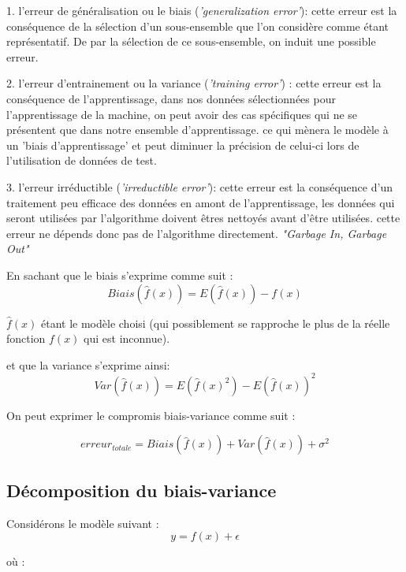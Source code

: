 \documentclass[a4paper]{article}
\begin{document}
1. l'erreur de généralisation ou le biais (\textit{'generalization error'}): cette erreur est la conséquence de la sélection d'un sous-ensemble que l'on considère comme étant représentatif. De par la sélection de ce sous-ensemble, on induit une possible erreur.\newline

2. l'erreur d'entrainement ou la variance (\textit{'training error'}) : cette erreur est la conséquence de l'apprentissage, dans nos données sélectionnées pour l'apprentissage de la machine, on peut avoir des cas spécifiques qui ne se présentent que dans notre ensemble d'apprentissage. ce qui mènera le modèle à un 'biais d'apprentissage' et peut diminuer la précision de celui-ci lors de l'utilisation de données de test.\newline

3. l'erreur irréductible (\textit{'irreductible error'}): cette erreur est la conséquence d'un traitement peu efficace des données en amont de l'apprentissage, les données qui seront utilisées par l'algorithme doivent êtres nettoyés avant d'être utilisées. cette erreur ne dépends donc pas de l'algorithme directement. \textit{"Garbage In, Garbage Out"}\newline


En sachant que le biais s'exprime comme suit : 
\[ Biais(\hat{f}(x)) = E(\hat{f}(x)) - f(x)\]

 $\hat{f}(x)$ étant le modèle choisi (qui possiblement se rapproche le plus de la réelle fonction $f(x)$ qui est inconnue).
 
 et que la variance s'exprime ainsi: 
 \[ Var(\hat{f}(x)) = E(\hat{f}(x)^2) - E(\hat{f}(x))^2 \]
 
On peut exprimer le compromis biais-variance comme suit : \cite{BiasVarianceTradeoffTextbooksUpdate}

\[ erreur_{totale} = Biais(\hat{f}(x)) + Var(\hat{f}(x)) + \sigma^2 \] 

\newpage

\subsection{Décomposition du biais-variance}
\label{decomposition_Biais_Variance_section}

Considérons le modèle suivant : 
\begin{equation}
\label{decomposition_Biais_Variance}
y = f(x) + \epsilon
\end{equation}

où : 
\end{document}
